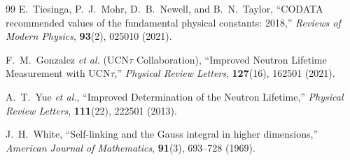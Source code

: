 \documentclass[12pt,a4paper]{article}
\begin{document}
\begin{thebibliography}{99}
		E.~Tiesinga, P.~J.~Mohr, D.~B.~Newell, and B.~N.~Taylor, 
		``CODATA recommended values of the fundamental physical constants: 2018,''
		\textit{Reviews of Modern Physics}, \textbf{93}(2), 025010 (2021).
		
		F.~M.~Gonzalez \textit{et al.} (UCN$\tau$ Collaboration), 
		``Improved Neutron Lifetime Measurement with UCN$\tau$,''
		\textit{Physical Review Letters}, \textbf{127}(16), 162501 (2021).
		
		A.~T.~Yue \textit{et al.}, 
		``Improved Determination of the Neutron Lifetime,''
		\textit{Physical Review Letters}, \textbf{111}(22), 222501 (2013).
		
		J.~H.~White, 
		``Self-linking and the Gauss integral in higher dimensions,''
		\textit{American Journal of Mathematics}, \textbf{91}(3), 693--728 (1969).
		
	\end{thebibliography}
	
\end{document}
